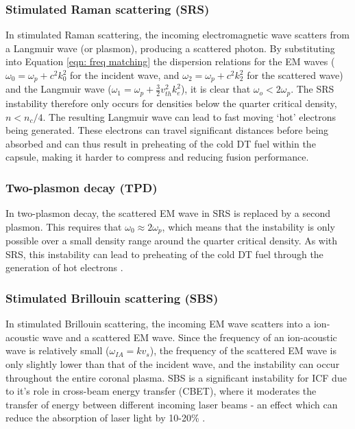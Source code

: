 \subsubsection{Stimulated Raman scattering (SRS)}
In stimulated Raman scattering, the incoming electromagnetic wave scatters from a Langmuir wave (or plasmon), producing a scattered photon. By substituting into Equation \ref{eqn: freq matching} the dispersion relations for the EM waves ($\omega_0 = \omega_p + c^2 k_0^2$ for the incident wave, and $\omega_2 = \omega_p + c^2 k_2^2$ for the scattered wave) and the Langmuir wave ($\omega_1 = \omega_p + \frac{3}{2} v_{th}^2 k_e^2$), it is clear that $\omega_o < 2 \omega_p$. The SRS instability therefore only occurs for densities below the quarter critical density, $n < n_c / 4$. The resulting Langmuir wave can lead to fast moving `hot' electrons being generated\cite{Rosenberg2018}. These electrons can travel significant distances before being absorbed and can thus result in preheating of the cold DT fuel within the capsule, making it harder to compress and reducing fusion performance.

\subsubsection{Two-plasmon decay (TPD)}
In two-plasmon decay, the scattered EM wave in SRS is replaced by a second plasmon. This requires that $\omega_0 \approx 2\omega_p$, which means that the instability is only possible over a small density range around the quarter critical density. As with SRS, this instability can lead to preheating of the cold DT fuel through the generation of hot electrons \cite{Yaakobi2000}.

\subsubsection{Stimulated Brillouin scattering (SBS)}
In stimulated Brillouin scattering, the incoming EM wave scatters into a ion-acoustic wave and a scattered EM wave. Since the frequency of an ion-acoustic wave is relatively small ($\omega_{IA} = kv_s$), the frequency of the scattered EM wave is only slightly lower than that of the incident wave, and the instability can occur throughout the entire coronal plasma. SBS is a significant instability for ICF due to it's role in cross-beam energy transfer (CBET), where it moderates the transfer of energy between different incoming laser beams - an effect which can reduce the absorption of laser light by 10-20\% \cite{Igumenshchev2012}.


